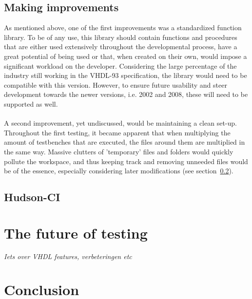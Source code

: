 \documentclass[11pt,british]{article}
\begin{document}
\subsection{Making improvements}
As mentioned above, one of the first improvements was a standardized function library. To be of any use, this library should contain functions and procedures that are either used extensively throughout the developmental process, have a great potential of being used or that, when created on their own, would impose a significant workload on the developer. Considering the large percentage of the industry still working in the VHDL-93 specification, the library would need to be compatible with this version. However, to ensure future usability and steer development towards the newer versions, i.e. 2002 and 2008, these will need to be supported as well.\\
\\
A second improvement, yet undiscussed, would be maintaining a clean set-up. Throughout the first testing, it became apparent that when multiplying the amount of testbenches that are executed, the files around them are multiplied in the same way. Massive clutters of 'temporary' files and folders would quickly pollute the workspace, and thus keeping track and removing unneeded files would be of the essence, especially considering later modifications (see section~\ref{sec:CI}).

\subsection{Hudson-CI}
\label{sec:CI}

\newpage{}
\section{The future of testing}
\emph{\color{red} Iets over VHDL features, verbeteringen etc}

\newpage{}
\section{Conclusion}

\pagebreak{}

\printbibliography
\end{document}
